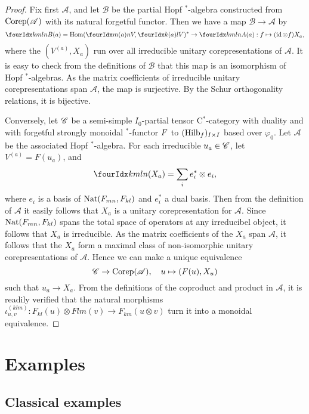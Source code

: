 \begin{proof} Fix first $\mathscr{A}$, and let $\mathscr{B}$ be the partial Hopf $^*$-algebra constructed from $\mathrm{Corep}(\mathscr{A})$ with its natural forgetful functor. Then we have a map $\mathscr{B} \rightarrow \mathscr{A}$ by \[ \Gr{B}{k}{l}{m}{n}(a) = \Hom(\Gr{V}{}{(a)}{m}{n},\Gr{V}{}{(a)}{k}{l})^* \rightarrow \Gr{A}{k}{l}{m}{n}(a):  f \mapsto (\id\otimes f)X_a,\] where the $(V^{(a)},X_a)$ run over all irreducible unitary corepresentations of $\mathscr{A}$. It is easy to check from the definitions of $\mathscr{B}$ that this map is an isomorphism of Hopf $^*$-algebras. As the matrix coefficients of irreducible unitary corepresentations span $\mathscr{A}$, the map is surjective. By the Schur orthogonality relations, it is bijective.

Conversely, let $\mathscr{C}$ be a semi-simple $I_0$-partial tensor C$^*$-category with duality and with forgetful strongly monoidal $^*$-functor $F$ to $(\mathrm{Hilb}_f)_{I\times I}$ based over $\varphi_0$. Let $\mathscr{A}$ be the associated Hopf $^*$-algebra. For each irreducible $u_a \in \mathscr{C}$, let $V^{(a)} = F(u_a)$, and \[\Gr{(X_a)}{k}{l}{m}{n} = \sum_i e_i^*\otimes e_i,\] where $e_i$ is a basis of $\operatorname{\mathrm{Nat}}(F_{mn},F_{kl})$ and $e_i^*$ a dual basis. Then from the definition of $\mathscr{A}$ it easily follows that $X_a$ is a unitary corepresentation for $\mathscr{A}$. Since $\operatorname{\mathrm{Nat}}(F_{mn},F_{kl})$ spans the total space of operators at any irreducibel object, it follows that $X_a$ is irreducible. As the matrix coefficients of the $X_a$ span $\mathscr{A}$, it follows that the $X_a$ form a maximal class of non-isomorphic unitary corepresentations of $\mathscr{A}$. Hence we can make a unique equivalence \[\mathscr{C}\rightarrow \mathrm{Corep}(\mathscr{A}), \quad u \mapsto (F(u),X_u)\] such that $u_a\rightarrow X_a$. From the definitions of the coproduct and product in $\mathscr{A}$, it is readily verified that the natural morphisms $\iota^{(klm)}_{u,v}:F_{kl}(u)\otimes F{lm}(v)\rightarrow F_{km}(u\otimes v)$ turn it into a monoidal equivalence. 
\end{proof}

\section{Examples}

\subsection{Classical examples}

